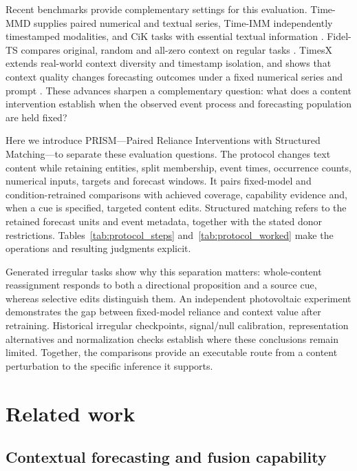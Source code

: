\documentclass[preprint,11pt]{elsarticle}
\newcommand{\prism}{\textsc{PRISM}}
\begin{document}
Recent benchmarks provide complementary settings for this evaluation. Time-MMD supplies paired numerical and textual series, Time-IMM independently timestamped modalities, and CiK tasks with essential textual information \cite{liu2024timemmd,chang2025timeimm,williams2025context}. Fidel-TS compares original, random and all-zero context on regular tasks \cite{xu2025fidelts}. TimesX extends real-world context diversity and timestamp isolation, and shows that context quality changes forecasting outcomes under a fixed numerical series and prompt \cite{liu2026timesx}. These advances sharpen a complementary question: what does a content intervention establish when the observed event process and forecasting population are held fixed?

Here we introduce \prism{}---Paired Reliance Interventions with Structured Matching---to separate these evaluation questions. The protocol changes text content while retaining entities, split membership, event times, occurrence counts, numerical inputs, targets and forecast windows. It pairs fixed-model and condition-retrained comparisons with achieved coverage, capability evidence and, when a cue is specified, targeted content edits. Structured matching refers to the retained forecast units and event metadata, together with the stated donor restrictions. Tables~\ref{tab:protocol_steps} and~\ref{tab:protocol_worked} make the operations and resulting judgments explicit.

Generated irregular tasks show why this separation matters: whole-content reassignment responds to both a directional proposition and a source cue, whereas selective edits distinguish them. An independent photovoltaic experiment demonstrates the gap between fixed-model reliance and context value after retraining. Historical irregular checkpoints, signal/null calibration, representation alternatives and normalization checks establish where these conclusions remain limited. Together, the comparisons provide an executable route from a content perturbation to the specific inference it supports.

\section{Related work}

\subsection{Contextual forecasting and fusion capability}
\end{document}
